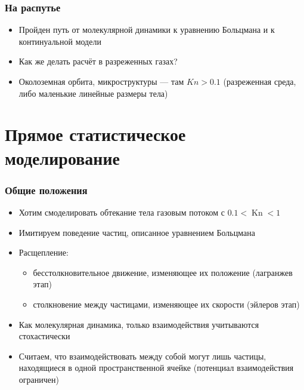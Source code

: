 \documentclass[onlymath]{beamer}
\DeclareMathOperator\Kn{Kn}
\begin{document}
\begin{frame}
  \frametitle{На распутье}
  \begin{itemize}
  \item Пройден путь от молекулярной динамики к уравнению Больцмана и
    к континуальной модели
  \item Как же делать расчёт в разреженных газах?
  \item Околоземная орбита, микроструктуры — там $Kn > 0.1$
    (разреженная среда, либо маленькие линейные размеры тела)
  \end{itemize}
\end{frame}

\section{Прямое статистическое моделирование}
\begin{frame}
  \frametitle{Общие положения}
  \begin{itemize}
  \item Хотим смоделировать обтекание тела газовым потоком с $0.1 <
    \Kn < 1$
  \item Имитируем поведение частиц, описанное уравнением Больцмана
  \item Расщепление:
    \begin{itemize}
      \item бесстолкновительное движение, изменяющее их положение (лагранжев этап)
      \item столкновение между частицами, изменяющее их скорости (эйлеров этап)
    \end{itemize}
  \item Как молекулярная динамика, только взаимодействия учитываются
    стохастически
  \item Считаем, что взаимодействовать между собой могут лишь частицы,
    находящиеся в одной пространственной ячейке (потенциал
    взаимодействия ограничен)
  \end{itemize}
\end{frame}
\end{document}
